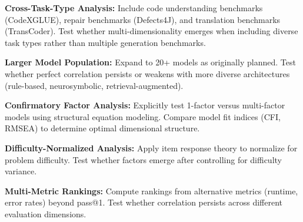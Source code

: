 
\textbf{Cross-Task-Type Analysis:} Include code understanding benchmarks (CodeXGLUE), repair benchmarks (Defects4J), and translation benchmarks (TransCoder). Test whether multi-dimensionality emerges when including diverse task types rather than multiple generation benchmarks.

\textbf{Larger Model Population:} Expand to 20+ models as originally planned. Test whether perfect correlation persists or weakens with more diverse architectures (rule-based, neurosymbolic, retrieval-augmented).

\textbf{Confirmatory Factor Analysis:} Explicitly test 1-factor versus multi-factor models using structural equation modeling. Compare model fit indices (CFI, RMSEA) to determine optimal dimensional structure.

\textbf{Difficulty-Normalized Analysis:} Apply item response theory to normalize for problem difficulty. Test whether factors emerge after controlling for difficulty variance.

\textbf{Multi-Metric Rankings:} Compute rankings from alternative metrics (runtime, error rates) beyond pass@1. Test whether correlation persists across different evaluation dimensions.

